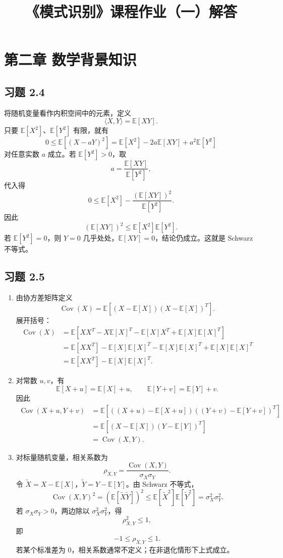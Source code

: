 \documentclass[UTF8,a4paper,12pt]{ctexart}
\title{《模式识别》课程作业（一）解答}
\author{}
\date{}
\newcommand{\E}{\mathbb{E}}
\newcommand{\Cov}{\operatorname{Cov}}
\begin{document}
\maketitle

\section*{第二章 数学背景知识}

\subsection*{习题 2.4}

将随机变量看作内积空间中的元素，定义
\[
    \langle X,Y\rangle=\E[XY].
\]
只要 $\E[X^2]$、$\E[Y^2]$ 有限，就有
\[
    0\le \E[(X-aY)^2]
      = \E[X^2]-2a\E[XY]+a^2\E[Y^2]
\]
对任意实数 $a$ 成立。若 $\E[Y^2]>0$，取
\[
    a=\frac{\E[XY]}{\E[Y^2]},
\]
代入得
\[
    0\le \E[X^2]-\frac{(\E[XY])^2}{\E[Y^2]}.
\]
因此
\[
    (\E[XY])^2\le \E[X^2]\E[Y^2].
\]
若 $\E[Y^2]=0$，则 $Y=0$ 几乎处处，$\E[XY]=0$，结论仍成立。这就是 Schwarz 不等式。

\subsection*{习题 2.5}

\begin{enumerate}
  \item 由协方差矩阵定义
  \[
      \Cov(X)=\E[(X-\E[X])(X-\E[X])^T].
  \]
  展开括号：
  \begin{align*}
      \Cov(X)
      &=\E\!\left[XX^T-X\E[X]^T-\E[X]X^T+\E[X]\E[X]^T\right]\\
      &=\E[XX^T]-\E[X]\E[X]^T-\E[X]\E[X]^T+\E[X]\E[X]^T\\
      &=\E[XX^T]-\E[X]\E[X]^T.
  \end{align*}

  \item 对常数 $u,v$，有
  \[
      \E[X+u]=\E[X]+u,\qquad \E[Y+v]=\E[Y]+v.
  \]
  因此
  \begin{align*}
      \Cov(X+u,Y+v)
      &=\E[((X+u)-\E[X+u])((Y+v)-\E[Y+v])^T]\\
      &=\E[(X-\E[X])(Y-\E[Y])^T]\\
      &=\Cov(X,Y).
  \end{align*}

  \item 对标量随机变量，相关系数为
  \[
      \rho_{X,Y}=\frac{\Cov(X,Y)}{\sigma_X\sigma_Y}.
  \]
  令 $\tilde X=X-\E[X]$，$\tilde Y=Y-\E[Y]$。由 Schwarz 不等式，
  \[
      \Cov(X,Y)^2=(\E[\tilde X\tilde Y])^2
      \le \E[\tilde X^2]\E[\tilde Y^2]
      =\sigma_X^2\sigma_Y^2.
  \]
  若 $\sigma_X\sigma_Y>0$，两边除以 $\sigma_X^2\sigma_Y^2$，得
  \[
      \rho_{X,Y}^2\le 1,
  \]
  即
  \[
      -1\le \rho_{X,Y}\le 1.
  \]
  若某个标准差为 $0$，相关系数通常不定义；在非退化情形下上式成立。
\end{enumerate}
\end{document}
